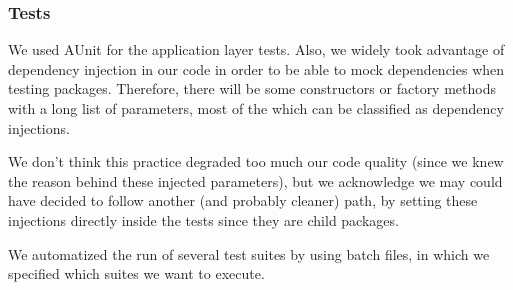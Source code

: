\subsubsection{Tests}
We used AUnit for the application layer tests.
Also, we widely took advantage of dependency injection in our code in order to
be able to mock dependencies when testing packages. Therefore, there will be
some constructors or factory methods with a long list of parameters, most of the
which can be classified as dependency injections.

We don't think this practice degraded too much our code quality (since we knew
the reason behind these injected parameters), but we acknowledge we may could
have decided to follow another (and probably cleaner) path, by setting these
injections directly inside the tests since they are child packages.

We automatized the run of several test suites by using batch files, in which we
specified which suites we want to execute.
